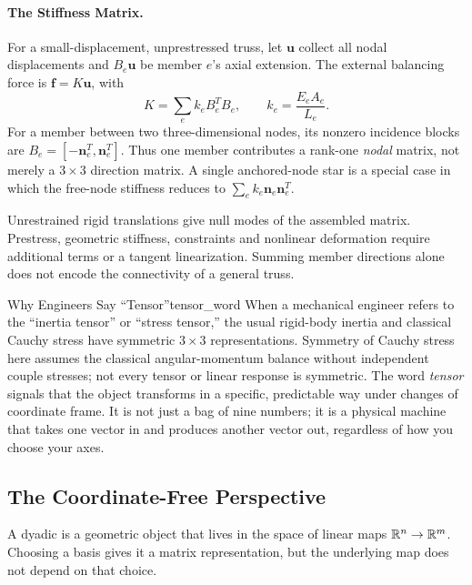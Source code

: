 \paragraph{The Stiffness Matrix.}
For a small-displacement, unprestressed truss, let $\mathbf u$ collect all nodal displacements and $B_e\mathbf u$ be member $e$'s axial extension. The external balancing force is $\mathbf f=K\mathbf u$, with
\[
K=\sum_e k_e B_e^TB_e,\qquad k_e=\frac{E_eA_e}{L_e}.
\]
For a member between two three-dimensional nodes, its nonzero incidence blocks are $B_e=[-\mathbf n_e^T,\mathbf n_e^T]$. Thus one member contributes a rank-one \emph{nodal} matrix, not merely a $3\times3$ direction matrix. A single anchored-node star is a special case in which the free-node stiffness reduces to $\sum_e k_e\mathbf n_e\mathbf n_e^T$.

Unrestrained rigid translations give null modes of the assembled matrix. Prestress, geometric stiffness, constraints and nonlinear deformation require additional terms or a tangent linearization. Summing member directions alone does not encode the connectivity of a general truss.

\begin{laymansbox}{Why Engineers Say ``Tensor''}{tensor_word}
When a mechanical engineer refers to the ``inertia tensor'' or
``stress tensor,'' the usual rigid-body inertia and classical Cauchy stress have symmetric $3\times3$ representations. Symmetry of Cauchy stress here assumes the classical angular-momentum balance without independent couple stresses; not every tensor or linear response is symmetric.  The word \emph{tensor} signals
that the object transforms in a specific, predictable way under
changes of coordinate frame.
It is not just a bag of nine numbers; it is a physical machine that
takes one vector in and produces another vector out, regardless of
how you choose your axes.
\end{laymansbox}

\subsection{The Coordinate-Free Perspective}
\label{subsec:coordinate-free}

A dyadic is a geometric object that lives in the space of linear maps
$\mathbb{R}^{n}\to\mathbb{R}^{m}$.  Choosing a basis gives it a matrix
representation, but the underlying map does not depend on that choice.

